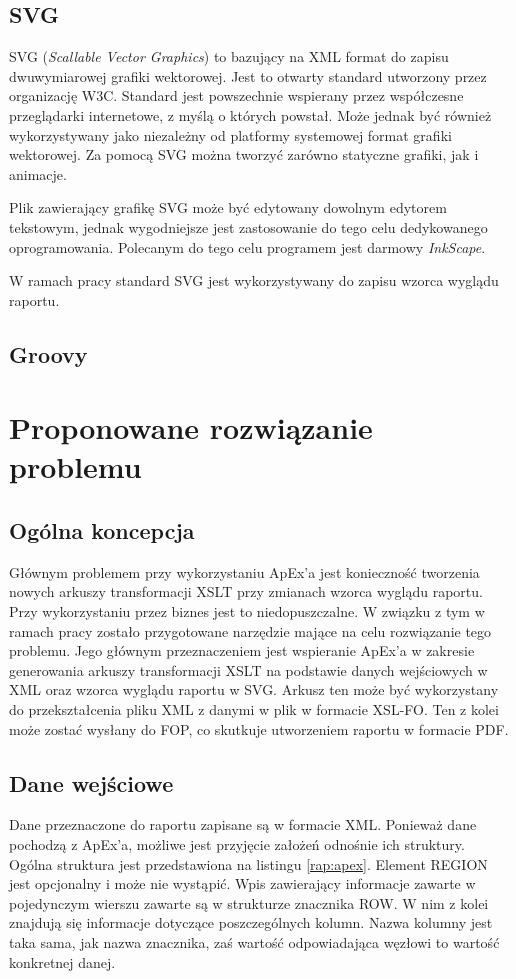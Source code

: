 \documentclass[11pt,a4paper]{article}
\begin{document}
\subsection{SVG} \label{tools:svg}
SVG (\emph{Scallable Vector Graphics}) to bazujący na XML format do zapisu dwuwymiarowej grafiki wektorowej. Jest to otwarty standard utworzony przez organizację W3C. Standard jest powszechnie wspierany przez współczesne przeglądarki internetowe, z myślą o których powstał. Może jednak być również wykorzystywany jako niezależny od platformy systemowej format grafiki wektorowej. Za pomocą SVG można tworzyć zarówno statyczne grafiki, jak i animacje.

Plik zawierający grafikę SVG może być edytowany dowolnym edytorem tekstowym, jednak wygodniejsze jest zastosowanie do tego celu dedykowanego oprogramowania. Polecanym do tego celu programem jest darmowy \emph{InkScape}.

W ramach pracy standard SVG jest wykorzystywany do zapisu wzorca wyglądu raportu. 

\subsection{Groovy} \label{tools:groovy}
\newpage


\section{Proponowane rozwiązanie problemu} \label{sec:solution}
\subsection{Ogólna koncepcja} \label{solution:koncept}
Głównym problemem przy wykorzystaniu ApEx'a jest konieczność tworzenia nowych arkuszy transformacji XSLT przy zmianach wzorca wyglądu raportu. Przy wykorzystaniu przez biznes jest to niedopuszczalne. W związku z tym w ramach pracy zostało przygotowane narzędzie mające na celu rozwiązanie tego problemu. Jego głównym przeznaczeniem jest wspieranie ApEx'a w zakresie generowania arkuszy transformacji XSLT na podstawie danych wejściowych w XML oraz wzorca wyglądu raportu w SVG. Arkusz ten może być wykorzystany do przekształcenia pliku XML z danymi w plik w formacie XSL-FO. Ten z kolei może zostać wysłany do FOP, co skutkuje utworzeniem raportu w formacie PDF.

\subsection{Dane wejściowe} \label{solution:data}
Dane przeznaczone do raportu zapisane są w formacie XML. Ponieważ dane pochodzą z ApEx'a, możliwe jest przyjęcie założeń odnośnie ich struktury. Ogólna struktura jest przedstawiona na listingu \ref{rap:apex}. Element REGION jest opcjonalny i może nie wystąpić. Wpis zawierający informacje zawarte w pojedynczym wierszu zawarte są w strukturze znacznika ROW. W nim z kolei znajdują się informacje dotyczące poszczególnych kolumn. Nazwa kolumny jest taka sama, jak nazwa znacznika, zaś wartość odpowiadająca węzłowi to wartość konkretnej danej.
\end{document}
